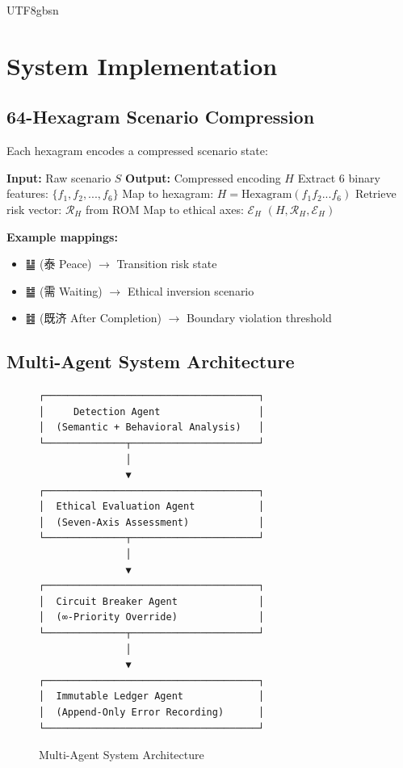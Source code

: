 \documentclass[conference]{IEEEtran}
\begin{document}
\begin{CJK}{UTF8}{gbsn}
\section{System Implementation}

\subsection{64-Hexagram Scenario Compression}

Each hexagram encodes a compressed scenario state:

\begin{algorithm}
\caption{Hexagram-Based Scenario Encoding}
\begin{algorithmic}[1]
\STATE \textbf{Input:} Raw scenario $S$
\STATE \textbf{Output:} Compressed encoding $H$
\STATE Extract 6 binary features: $\{f_1, f_2, ..., f_6\}$
\STATE Map to hexagram: $H = \text{Hexagram}(f_1f_2...f_6)$
\STATE Retrieve risk vector: $\mathcal{R}_H$ from ROM
\STATE Map to ethical axes: $\mathcal{E}_H$
\RETURN $(H, \mathcal{R}_H, \mathcal{E}_H)$
\end{algorithmic}
\end{algorithm}

\textbf{Example mappings:}
\begin{itemize}
    \item ䷊ (泰 Peace) $\rightarrow$ Transition risk state
    \item ䷄ (需 Waiting) $\rightarrow$ Ethical inversion scenario
    \item ䷾ (既济 After Completion) $\rightarrow$ Boundary violation threshold
\end{itemize}

\subsection{Multi-Agent System Architecture}

\begin{figure}[h]
\centering
\begin{verbatim}
┌─────────────────────────────────────┐
│     Detection Agent                 │
│  (Semantic + Behavioral Analysis)   │
└──────────────┬──────────────────────┘
               │
               ▼
┌─────────────────────────────────────┐
│  Ethical Evaluation Agent           │
│  (Seven-Axis Assessment)            │
└──────────────┬──────────────────────┘
               │
               ▼
┌─────────────────────────────────────┐
│  Circuit Breaker Agent              │
│  (∞-Priority Override)              │
└──────────────┬──────────────────────┘
               │
               ▼
┌─────────────────────────────────────┐
│  Immutable Ledger Agent             │
│  (Append-Only Error Recording)      │
└─────────────────────────────────────┘
\end{verbatim}
\caption{Multi-Agent System Architecture}
\label{fig:mas_arch}
\end{figure}


\end{CJK}
\end{document}
